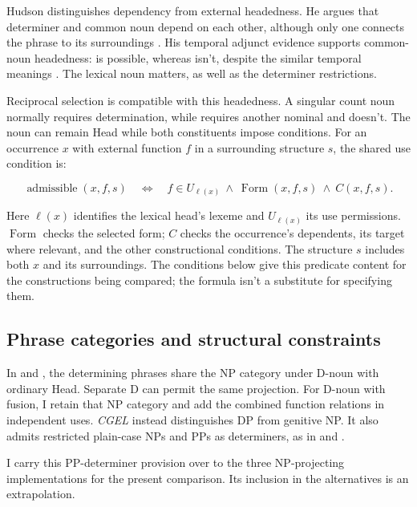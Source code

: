 \documentclass[12pt]{article}
\begin{document}
Hudson distinguishes dependency from external headedness. He argues that determiner and common noun depend on each other, although only one connects the phrase to its surroundings \citep[7--8]{hudson2004determiners}. His temporal adjunct evidence supports common-noun headedness:  is possible, whereas  isn't, despite the similar temporal meanings \citep[10--12]{hudson2004determiners}. The lexical noun matters, as well as the determiner restrictions.

Reciprocal selection is compatible with this headedness. A singular count noun normally requires determination, while  requires another nominal and  doesn't. The noun can remain Head while both constituents impose conditions. For an occurrence $x$ with external function $f$ in a surrounding structure $s$, the shared use condition is:

\[
\operatorname{admissible}(x,f,s)
\quad\Longleftrightarrow\quad
f\in U_{\ell(x)}\ \land\ \operatorname{Form}(x,f,s)\ \land\ C(x,f,s).
\]

Here $\ell(x)$ identifies the lexical head's lexeme and $U_{\ell(x)}$ its use permissions. $\operatorname{Form}$ checks the selected form; $C$ checks the occurrence's dependents, its target where relevant, and the other constructional conditions. The structure $s$ includes both $x$ and its surroundings. The conditions below give this predicate content for the constructions being compared; the formula isn't a substitute for specifying them.

\subsection{Phrase categories and structural constraints}\label{sec:det-uniform}

In  and , the determining phrases share the NP category under D-noun with ordinary Head. Separate D can permit the same projection. For D-noun with fusion, I retain that NP category and add the combined function relations in independent uses. \textit{CGEL} instead distinguishes DP from genitive NP. It also admits restricted plain-case NPs and PPs as determiners, as in  and  \citep[Ch.~5, §4]{huddleston2002}.

I carry this PP-determiner provision over to the three NP-projecting implementations for the present comparison. Its inclusion in the alternatives is an extrapolation.
\end{document}

